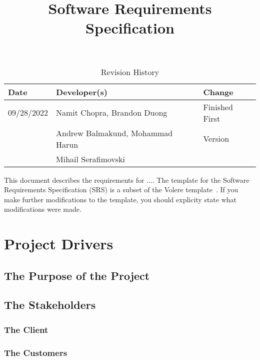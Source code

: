 \documentclass{article}
\title{Software Requirements Specification\\\progname}
\author{\authname}
\date{}
\begin{document}
\begin{table}[hp]
\caption{Revision History} \label{TblRevisionHistory}
\begin{tabularx}{\textwidth}{llX}
\toprule
\textbf{Date} & \textbf{Developer(s)} & \textbf{Change}\\
\midrule
09/28/2022 & Namit Chopra, Brandon Duong  & Finished First\\
 & Andrew Balmakund, Mohammad Harun &  Version\\
 & Mihail Serafimovski & \\
\bottomrule
\end{tabularx}
\end{table}

\newpage

\maketitle

\newpage

\tableofcontents
\listoftables
\listoffigures
\newpage


This document describes the requirements for ....  The template for the Software
Requirements Specification (SRS) is a subset of the Volere
template~\citep{RobertsonAndRobertson2012}.  If you make further modifications
to the template, you should explicity state what modifications were made.

\section{Project Drivers}

\subsection{The Purpose of the Project}

\subsection{The Stakeholders}

\subsubsection{The Client}

\subsubsection{The Customers}
\end{document}
